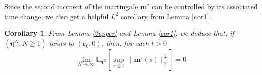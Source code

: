 \documentclass[12pt, leqno]{article}
\newtheorem{cor}{Corollary}
\newcommand*{\norm}[1]{\lVert #1 \rVert}
\newcommand{\dd}{{\mathrm d}}
\begin{document}
%
%


Since the second moment of the martingale $\bm m^\tau$ can be controlled by its associated time change, we also get a helpful $L^2$ corollary from Lemma \ref{cor1}.
\begin{cor}\label{cor2}
From Lemma \ref{2upper} and Lemma \ref{cor1}, we deduce that, if $(\bm \eta^N, N\geq 1)$ tends to $( \bm r_0, 0)$, then, for each $t>0$
\[
\lim_{N\to\infty}\mathbb{E}_{\bm \eta^N}\left[\sup_{s\leq t}\norm{\bm m^\tau(s) }^2_2\right] =0
\]
\end{cor}
\end{document}
